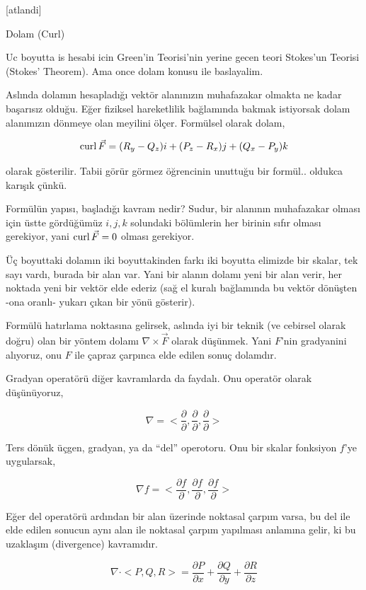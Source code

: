 \documentclass[12pt,fleqn]{article}\usepackage{../../common}
\begin{document}
[atlandi]

Dolam (Curl)

Uc boyutta is hesabi icin Green'in Teorisi'nin yerine gecen teori Stokes'un
Teorisi (Stokes' Theorem). Ama once dolam konusu ile baslayalim.

Aslında dolamın hesapladığı vektör alanınızın muhafazakar olmakta ne kadar
başarısız olduğu. Eğer fiziksel hareketlilik bağlamında bakmak istiyorsak
dolam alanımızın dönmeye olan meyilini ölçer. Formülsel olarak dolam,

$$
\operatorname{curl} \vec{F} = (R_y - Q_z) i + (P_z - R_x) j + (Q_x - P_y) k
$$

olarak gösterilir. Tabii görür görmez öğrencinin unuttuğu bir formül..
oldukca karışık çünkü.

Formülün yapısı, başladığı kavram nedir? Sudur, bir alanının muhafazakar olması
için üstte gördüğümüz $i,j,k$ solundaki bölümlerin her birinin sıfır olması
gerekiyor, yani $\operatorname{curl} \vec{F} = 0$ olması gerekiyor.

Üç boyuttaki dolamın iki boyuttakinden farkı iki boyutta elimizde bir skalar,
tek sayı vardı, burada bir alan var. Yani bir alanın dolamı yeni bir alan verir,
her noktada yeni bir vektör elde ederiz (sağ el kuralı bağlamında bu vektör
dönüşten -ona oranlı- yukarı çıkan bir yönü gösterir). 

Formülü hatırlama noktasına gelirsek, aslında iyi bir teknik (ve cebirsel olarak
doğru) olan bir yöntem dolamı $\nabla \times \vec{F}$ olarak düşünmek. Yani
$F$'nin gradyanini alıyoruz, onu $F$ ile çapraz çarpınca elde edilen sonuç
dolamdır. 

Gradyan operatörü diğer kavramlarda da faydalı. Onu operatör olarak düşünüyoruz,

$$
\nabla = < \frac{\partial }{\partial },
           \frac{\partial }{\partial },
           \frac{\partial }{\partial } >
$$

Ters dönük üçgen, gradyan, ya da ``del'' operotoru. Onu bir skalar fonksiyon
$f$'ye uygularsak,

$$
\nabla f = < \frac{\partial f}{\partial },
             \frac{\partial f}{\partial },
             \frac{\partial f}{\partial } >
$$

Eğer del operatörü ardından bir alan üzerinde noktasal çarpım varsa, bu del
ile elde edilen sonucun aynı alan ile noktasal çarpım yapılması anlamına
gelir, ki bu uzaklaşım (divergence) kavramıdır.

$$
\nabla \cdot < P,Q,R > =
\frac{\partial P}{\partial x} +
\frac{\partial Q}{\partial y} +
\frac{\partial R}{\partial z}
$$
\end{document}
